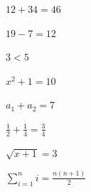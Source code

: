 \documentclass[12pt]{article}
\newcommand{\sample}[1]{\vspace*{\fill}\centerline{$\displaystyle #1$}\vspace*{\fill}\newpage}
\begin{document}
\sample{12 + 34 = 46}
\sample{19 - 7 = 12}
\sample{3 < 5}
\sample{x^{2} + 1 = 10}
\sample{a_{1} + a_{2} = 7}
\sample{\frac{1}{2} + \frac{1}{4} = \frac{3}{4}}
\sample{\sqrt{x+1} = 3}
\sample{\sum_{i=1}^{n} i = \frac{n(n+1)}{2}}
\end{document}
